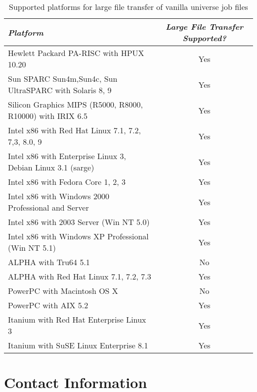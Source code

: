 \begin{center}
\begin{table}[hbt]
\begin{tabular}{|lc|} \hline
\emph{Platform} & \emph{Large File Transfer Supported?} \\ \hline \hline
Hewlett Packard PA-RISC with HPUX 10.20 & Yes \\ \hline
Sun SPARC Sun4m,Sun4c, Sun UltraSPARC with Solaris 8, 9 & Yes \\ \hline
Silicon Graphics MIPS (R5000, R8000, R10000) with IRIX 6.5 &  Yes \\ \hline
Intel x86 with Red Hat Linux 7.1, 7.2, 7,3, 8.0, 9 & Yes \\ 
Intel x86 with Enterprise Linux 3, Debian Linux 3.1 (sarge) & Yes \\ 
Intel x86 with Fedora Core 1, 2, 3 & Yes \\
Intel x86 with Windows 2000 Professional and Server  & Yes \\ 
Intel x86 with 2003 Server (Win NT 5.0) & Yes \\ 
Intel x86 with Windows XP Professional (Win NT 5.1) & Yes \\ \hline
ALPHA with  Tru64 5.1  & No \\ 
ALPHA with Red Hat Linux 7.1, 7.2, 7.3 & Yes \\ \hline
PowerPC with Macintosh OS X  & No \\
PowerPC with AIX 5.2  & Yes \\ \hline
Itanium with Red Hat Enterprise Linux 3 & Yes \\
Itanium with SuSE Linux Enterprise 8.1 & Yes \\ \hline
\end{tabular}
\caption{\label{large-file-support}Supported platforms for large file transfer of vanilla universe job files}
\end{table}
\end{center}


 


\section{\label{contact-info}Contact Information}

